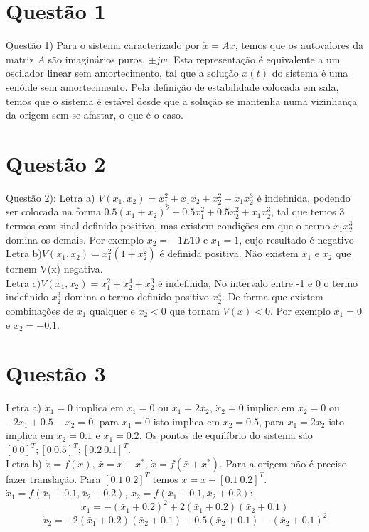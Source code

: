 \section{Questão 1}
Questão 1) Para o sistema caracterizado por $\dot{x} = Ax$, temos que os autovalores da matriz $A$ são imaginários puros, $\pm jw$. Esta representação é equivalente a um oscilador linear sem amortecimento, tal que a solução $x(t)$ do sistema é uma senóide sem amortecimento. Pela definição de estabilidade colocada em sala, temos que o sistema é estável desde que a solução se mantenha numa vizinhança da origem sem se afastar, o que é o caso. 



\section{Questão 2}
Questão 2): Letra a) $V(x_1,x_2) = x_1^2 +x_1x_2+x_2^2+x_1x_2^3$ é indefinida, podendo ser colocada na forma $0.5(x_1 + x_2)^2 + 0.5x_1^2 + 0.5x_2^2 + x_1x_2^3$, tal que temos 3 termos com sinal definido positivo, mas existem condições em que o termo $x_1x_2^3$ domina os demais. Por exemplo $x_2=-1E10$ e $x_1=1$, cujo resultado é negativo\\

\noindent Letra b)$V(x_1,x_2) = x_1^2(1+x_2^2)$ é definida positiva. Não existem $x_1$ e $x_2$ que tornem V(x) negativa.\\ 

\noindent Letra c)$V(x_1,x_2) = x_1^2+x_2^4+x_2^3$ é indefinida, No intervalo entre -1 e 0 o termo indefinido $x_2^3$ domina o termo definido positivo $x_2^4$. De forma que existem combinações de $x_1$ qualquer e $x_2<0$ que tornam $V(x)<0$. Por exemplo $x_1 = 0$ e $x_2 = -0.1$.\\

\section{Questão 3}

Letra a) $\dot{x}_1 = 0$ implica em $x_1=0$ ou $x_1=2x_2$, $\dot{x}_2 = 0$ implica em $x_2=0$ ou $-2x_1+0.5-x_2=0$, para $x_1=0$ isto implica em $x_2=0.5$, para $x_1=2x_2$ isto implica em $x_2=0.1$ e $x_1=0.2$. Os pontos de equilíbrio do sistema são $[0~0]^T;[0~0.5]^T;[0.2~0.1]^T$.\\

Letra b) $\dot{x} = f(x)$, $\bar{x} = x - x^*$, $\dot{x}=f(\bar{x}+x^*)$. Para a origem não é preciso fazer translação. Para $[0.1~0.2]^T$ temos $\bar{x} = x - [0.1~0.2]^T$. $\dot{x}_1=f(\bar{x}_1+0.1,\bar{x}_2+0.2)$, $\dot{x}_2=f(\bar{x}_1+0.1,\bar{x}_2+0.2)$:
\begin{equation}
\dot{x}_1=-(\bar{x}_1+0.2)^2 + 2(\bar{x}_1+0.2)(\bar{x}_2+0.1) 
\end{equation}
\begin{equation}
\dot{x}_2=-2(\bar{x}_1+0.2)(\bar{x}_2+0.1) + 0.5(\bar{x}_2+0.1)-(\bar{x}_2+0.1)^2 
\end{equation} 

